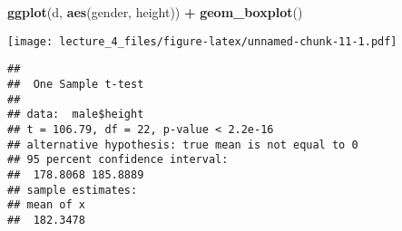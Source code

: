 \documentclass[]{article}
\newenvironment{Shaded}{\begin{snugshade}}{\end{snugshade}}
\newcommand{\KeywordTok}[1]{\textcolor[rgb]{0.13,0.29,0.53}{\textbf{#1}}}
\newcommand{\NormalTok}[1]{#1}
\newcommand{\OperatorTok}[1]{\textcolor[rgb]{0.81,0.36,0.00}{\textbf{#1}}}
\newcommand{\StringTok}[1]{\textcolor[rgb]{0.31,0.60,0.02}{#1}}
\begin{document}
\begin{Shaded}
\begin{Highlighting}[]
\KeywordTok{ggplot}\NormalTok{(d, }\KeywordTok{aes}\NormalTok{(gender, height)) }\OperatorTok{+}
\StringTok{  }\KeywordTok{geom_boxplot}\NormalTok{()}
\end{Highlighting}
\end{Shaded}

\texttt{[image: lecture\_4\_files/figure-latex/unnamed-chunk-11-1.pdf]}

\begin{Shaded}
\end{Shaded}

\begin{verbatim}
## 
##  One Sample t-test
## 
## data:  male$height
## t = 106.79, df = 22, p-value < 2.2e-16
## alternative hypothesis: true mean is not equal to 0
## 95 percent confidence interval:
##  178.8068 185.8889
## sample estimates:
## mean of x 
##  182.3478
\end{verbatim}
\end{document}
